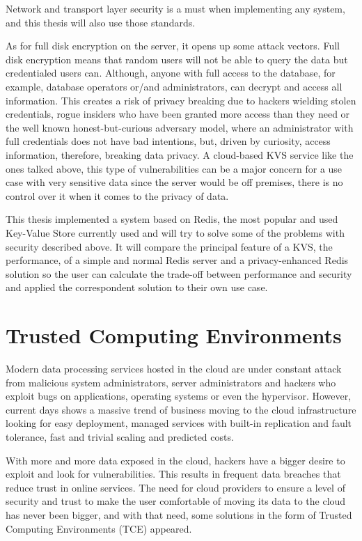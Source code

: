 Network and transport layer security is a must when implementing any system, and this thesis will also use those standards. 

As for full disk encryption on the server, it opens up some attack vectors. Full disk encryption means that random users will not be able to query the data but credentialed users can. Although, anyone with full access to the database, for example, database operators or/and administrators, can decrypt and access all information. This creates a risk of privacy breaking due to hackers wielding stolen credentials, rogue insiders who have been granted more access than they need or the well known honest-but-curious adversary model, where an administrator with full credentials does not have bad intentions, but, driven by curiosity, access information, therefore, breaking data privacy. A cloud-based \gls{KVS} service like the ones talked above, this type of vulnerabilities can be a major concern for a use case with very sensitive data since the server would be off premises, there is no control over it when it comes to the privacy of data.

This thesis implemented a system based on Redis, the most popular and used Key-Value Store currently used and will try to solve some of the problems with security described above. It will compare the principal feature of a \gls{KVS}, the performance, of a simple and normal Redis server and a privacy-enhanced Redis solution so the user can calculate the trade-off between performance and security and applied the correspondent solution to their own use case.

\section{Trusted  Computing Environments} %
\label{sec:trusted_computing _environments}

Modern data processing services hosted in the cloud are under constant attack from malicious system administrators, server administrators and hackers who exploit bugs on applications, operating systems or even the hypervisor. However, current days shows a massive trend of business moving to the cloud infrastructure looking for easy deployment, managed services with built-in replication and fault tolerance, fast and trivial scaling and predicted costs.

With more and more data exposed in the cloud, hackers have a bigger desire to exploit and look for vulnerabilities. This results in frequent data breaches that reduce trust in online services. The need for cloud providers to ensure a level of security and trust to make the user comfortable of moving its data to the cloud has never been bigger, and with that need, some solutions in the form of Trusted Computing Environments (\gls{TCE}) appeared.

